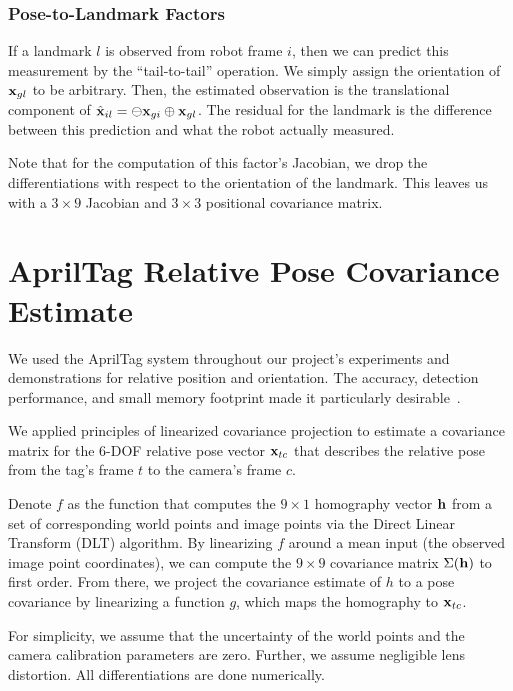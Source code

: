 \documentclass[conference]{IEEEtran}
\begin{document}
\subsubsection{Pose-to-Landmark Factors}
\label{subs:pointnodelinear}

If a landmark $l$ is observed from robot frame $i$, then we can predict this measurement
by the ``tail-to-tail'' operation.  We simply assign the orientation of ${\bf x}_{gl}$ to
be arbitrary.  Then, the estimated observation is the translational component of $ {\hat
  {\bf x}}_{il} = \ominus {\bf x}_{gi} \oplus {\bf x}_{gl} $. The residual for the
landmark is the difference between this prediction and what the robot actually measured.

Note that for the computation of this factor's Jacobian, we drop the differentiations with
respect to the orientation of the landmark.  This leaves us with a $3 \times 9$ Jacobian
and $3 \times 3$ positional covariance matrix. 

\section{AprilTag Relative Pose Covariance Estimate}
\label{sec:apriltags}


We used the AprilTag system throughout our project's experiments and demonstrations for
relative position and orientation.  The accuracy, detection performance, and small memory
footprint made it particularly desirable~\cite{olson2011tags}.

We applied principles of linearized covariance projection to estimate a covariance matrix
for the 6-\ac{DOF} relative pose vector ${\bf x}_{tc}$ that describes the relative pose from
the tag's frame $t$ to the camera's frame $c$.

Denote $f$ as the function that computes the $9 \times 1$ homography vector ${\bf h}$ from
a set of corresponding world points and image points via the Direct Linear Transform (DLT)
algorithm.  By linearizing $f$ around a mean input (the observed image point coordinates),
we can compute the $9 \times 9$ covariance matrix $\Sigma({\bf h})$ to first order.  From
there, we project the covariance estimate of $h$ to a pose covariance by linearizing a
function $g$, which maps the homography to ${\bf x}_{tc}$.

For simplicity, we assume that the uncertainty of the world points and the camera
calibration parameters are zero.  Further, we assume negligible lens distortion.  All
differentiations are done numerically.
\end{document}
